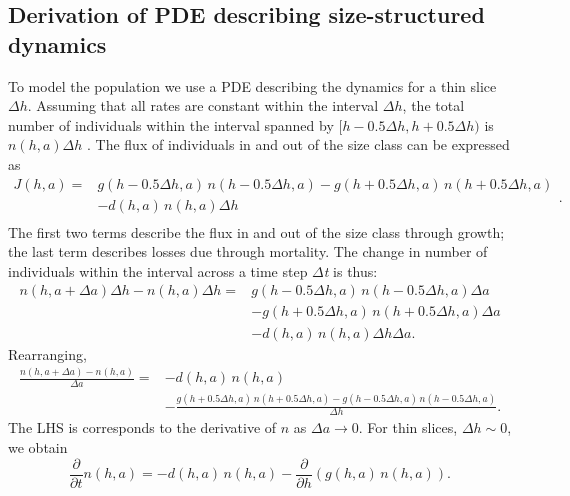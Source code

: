 \documentclass[10pt,twoside]{article}
\begin{document}
\subsection{Derivation of PDE describing size-structured
dynamics}\label{derivation-of-pde-describing-size-structured-dynamics}

To model the population we use a PDE describing the dynamics for a thin
slice \(\Delta h\). Assuming that all rates are constant within the
interval \(\Delta h\), the total number of individuals within the
interval spanned by \([h-0.5\Delta h,h+0.5\Delta h)\) is
\(n(h,a)\Delta h\) . The flux of individuals in and out of the size
class can be expressed as
\begin{equation}\begin{array}{ll} J(h,a)=&g(h-0.5 \Delta h,a) \, n(h-0.5 \Delta h,a)-g(h+0.5 \Delta h,a) \, n(h+0.5 \Delta h,a) \\ &-d (h,a) \, n(h,a)\Delta h\\ \end{array}.
\end{equation}
The first two terms describe the flux in and out of the size class
through growth; the last term describes losses due through mortality.
The change in number of individuals within the interval across a time
step \textit{$\Delta $t} is thus:
\begin{equation}
  \begin{array}{ll} n(h,a+\Delta a)\Delta h-n(h,a)\Delta h= &g(h-0.5 \Delta h,a) \, n(h-0.5 \Delta h,a)\Delta a \\ &-g(h+0.5 \Delta h,a) \, n(h+0.5 \Delta h,a)\Delta a\\&-d (h,a) \, n(h,a)\Delta h\Delta a.
  \end{array}
\end{equation}
Rearranging,
\begin{equation}
  \begin{array}{ll}
  \frac{n(h,a+\Delta a)-n(h,a)}{\Delta a} = &-d (h,a) \, n(h,a) \\
  &-\frac{g(h+0.5 \Delta h,a) \, n(h+0.5 \Delta h,a)-g(h-0.5 \Delta h,a) \, n(h-0.5 \Delta h,a)}{\Delta h}.
  \end{array}
\end{equation}
The LHS is corresponds to the derivative of \(n\) as \(\Delta a\to 0\).
For thin slices, \(\Delta h \sim 0\), we obtain
\begin{equation} \label{eq:PDE-app}
  \frac{\partial }{\partial t} n(h,a)=-d (h,a) \, n(h,a)-\frac{\partial }{\partial h} (g(h,a) \, n(h,a)).
\end{equation}
\end{document}
